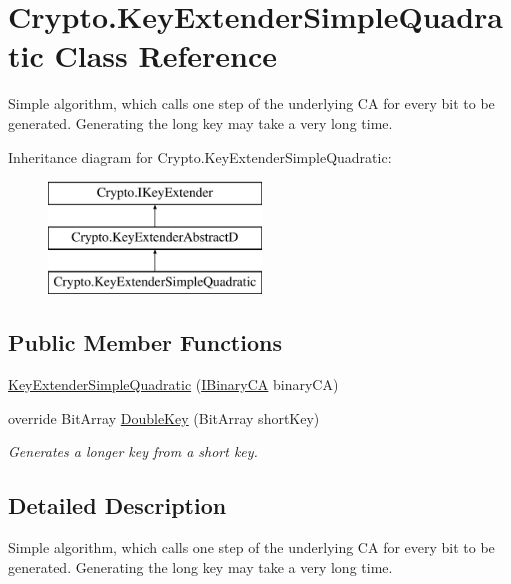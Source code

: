 \hypertarget{class_crypto_1_1_key_extender_simple_quadratic}{}\section{Crypto.\+Key\+Extender\+Simple\+Quadratic Class Reference}
\label{class_crypto_1_1_key_extender_simple_quadratic}


Simple algorithm, which calls one step of the underlying C\+A for every bit to be generated. Generating the long key may take a very long time.  


Inheritance diagram for Crypto.\+Key\+Extender\+Simple\+Quadratic\+:\begin{figure}[H]
\begin{center}
\leavevmode
\includegraphics[height=3.000000cm]{class_crypto_1_1_key_extender_simple_quadratic}
\end{center}
\end{figure}
\subsection*{Public Member Functions}
\begin{DoxyCompactItemize}
\item 
\hyperlink{class_crypto_1_1_key_extender_simple_quadratic_a2090b48093409cd09a18c56ac7ec7826}{Key\+Extender\+Simple\+Quadratic} (\hyperlink{interface_cellular_1_1_i_binary_c_a}{I\+Binary\+C\+A} binary\+C\+A)
\item 
override Bit\+Array \hyperlink{class_crypto_1_1_key_extender_simple_quadratic_a0bba7646011678850879c0685d18b379}{Double\+Key} (Bit\+Array short\+Key)
\begin{DoxyCompactList}\small\item\em Generates a longer key from a short key. \end{DoxyCompactList}\end{DoxyCompactItemize}


\subsection{Detailed Description}
Simple algorithm, which calls one step of the underlying C\+A for every bit to be generated. Generating the long key may take a very long time. 



